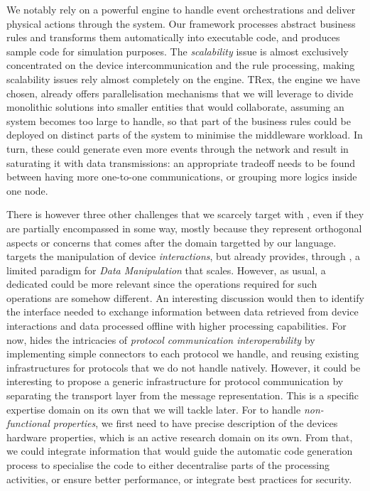 We notably rely on a powerful \CEP engine to handle event orchestrations and deliver physical actions through the system. Our framework processes abstract business rules and transforms them automatically into executable code, and produces sample code for simulation purposes. The \emph{scalability} issue is almost exclusively concentrated on the device intercommunication and the rule processing, making scalability issues rely almost completely on the \CEP engine. TRex, the engine we have chosen, already offers parallelisation mechanisms that we will leverage to divide monolithic solutions into smaller entities that would collaborate, assuming an \IOT system becomes too large to handle, so that part of the business rules could be deployed on distinct parts of the system to minimise the middleware workload. In turn, these could generate even more events through the network and result in saturating it with data transmissions: an appropriate tradeoff needs to be found between having more one-to-one communications, or grouping more logics inside one node.

There is however three other challenges that we scarcely target with \IOTDSL, even if they are partially encompassed in some way, mostly because they represent orthogonal aspects or concerns that comes after the domain targetted by our language. \IOTDSL targets the manipulation of device \emph{interactions}, but already provides, through \CEP, a limited paradigm for \emph{Data Manipulation} that scales. However, as usual, a dedicated \DSL could be more relevant since the operations required for such operations are somehow different. An interesting discussion would then to identify the interface needed to exchange information between data retrieved from device interactions and data processed offline with higher processing capabilities. For now, \IOTDSL hides the intricacies of \emph{protocol communication interoperability} by implementing simple connectors to each protocol we handle, and reusing existing infrastructures for protocols that we do not handle natively. However, it could be interesting to propose a generic infrastructure for protocol communication by separating the transport layer from the message representation. This is a specific expertise domain on its own that we will tackle later. For \IOTDSL to handle \emph{non-functional properties}, we first need to have precise description of the devices hardware properties, which is an active research domain on its own. From that, we could integrate information that would guide the automatic code generation process to specialise the code to either decentralise parts of the processing activities, or ensure better performance, or integrate best practices for security.

